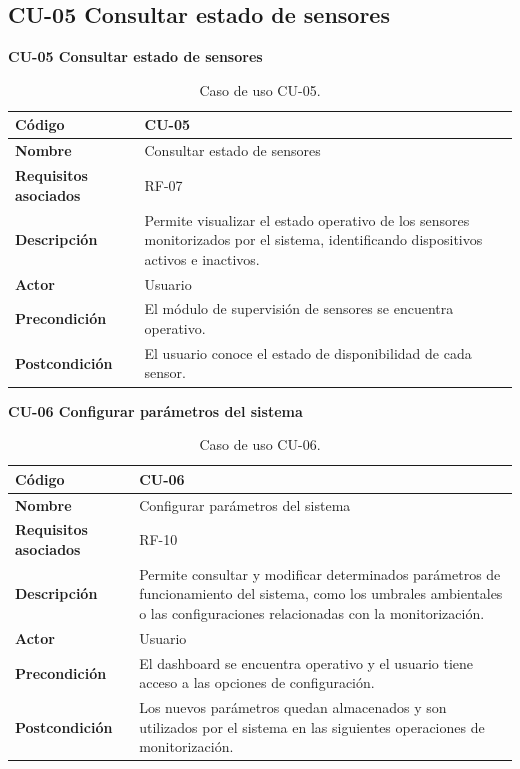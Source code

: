 \subsection{CU-05 Consultar estado de sensores}
\textbf{\large CU-05 Consultar estado de sensores}
\vspace{0.1cm}
\begin{table}[H]
	\centering
	\begin{tabular}{|p{4cm}|p{9cm}|}
		\hline
		\textbf{Código} & CU-05 \\
		\hline
		\textbf{Nombre} & Consultar estado de sensores \\
		\hline
		\textbf{Requisitos asociados} & RF-07 \\
		\hline
		\textbf{Descripción} & Permite visualizar el estado operativo de los sensores monitorizados por el sistema, identificando dispositivos activos e inactivos. \\
		\hline
		\textbf{Actor} & Usuario \\
		\hline
		\textbf{Precondición} & El módulo de supervisión de sensores se encuentra operativo. \\
		\hline
		\textbf{Postcondición} & El usuario conoce el estado de disponibilidad de cada sensor. \\
		\hline
	\end{tabular}
	\caption{Caso de uso CU-05.}
\end{table}

\textbf{\large CU-06 Configurar parámetros del sistema}
\vspace{0.1cm}
\begin{table}[H]
	\centering
	\begin{tabular}{|p{4cm}|p{9cm}|}
		\hline
		\textbf{Código} & CU-06 \\
		\hline
		\textbf{Nombre} & Configurar parámetros del sistema \\
		\hline
		\textbf{Requisitos asociados} & RF-10 \\
		\hline
		\textbf{Descripción} & Permite consultar y modificar determinados parámetros de funcionamiento del sistema, como los umbrales ambientales o las configuraciones relacionadas con la monitorización. \\
		\hline
		\textbf{Actor} & Usuario \\
		\hline
		\textbf{Precondición} & El dashboard se encuentra operativo y el usuario tiene acceso a las opciones de configuración. \\
		\hline
		\textbf{Postcondición} & Los nuevos parámetros quedan almacenados y son utilizados por el sistema en las siguientes operaciones de monitorización. \\
		\hline
	\end{tabular}
	\caption{Caso de uso CU-06.}
\end{table}


